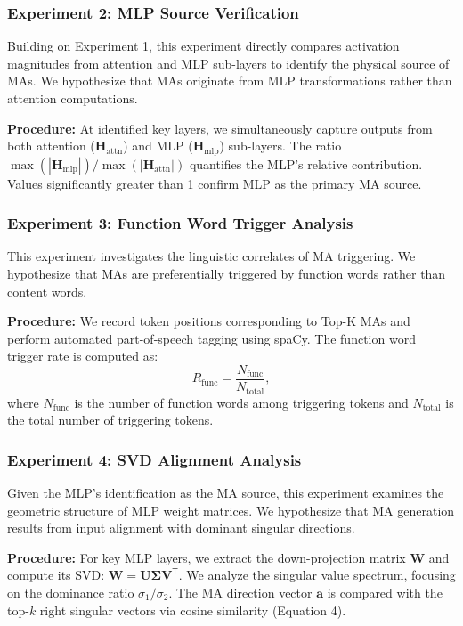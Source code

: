 \documentclass[conference]{IEEEtran}
\begin{document}
\subsubsection{Experiment 2: MLP Source Verification}

Building on Experiment 1, this experiment directly compares activation magnitudes from attention and MLP sub-layers to identify the physical source of MAs. We hypothesize that MAs originate from MLP transformations rather than attention computations.

\textbf{Procedure:} At identified key layers, we simultaneously capture outputs from both attention ($\mathbf{H}_{\text{attn}}$) and MLP ($\mathbf{H}_{\text{mlp}}$) sub-layers. The ratio $\max(|\mathbf{H}_{\text{mlp}}|)/\max(|\mathbf{H}_{\text{attn}}|)$ quantifies the MLP's relative contribution. Values significantly greater than 1 confirm MLP as the primary MA source.

\subsubsection{Experiment 3: Function Word Trigger Analysis}

This experiment investigates the linguistic correlates of MA triggering. We hypothesize that MAs are preferentially triggered by function words rather than content words.

\textbf{Procedure:} We record token positions corresponding to Top-K MAs and perform automated part-of-speech tagging using spaCy. The function word trigger rate is computed as:
\begin{equation}
R_{\text{func}} = \frac{N_{\text{func}}}{N_{\text{total}}},
\end{equation}
where $N_{\text{func}}$ is the number of function words among triggering tokens and $N_{\text{total}}$ is the total number of triggering tokens.

\subsubsection{Experiment 4: SVD Alignment Analysis}

Given the MLP's identification as the MA source, this experiment examines the geometric structure of MLP weight matrices. We hypothesize that MA generation results from input alignment with dominant singular directions.

\textbf{Procedure:} For key MLP layers, we extract the down-projection matrix $\mathbf{W}$ and compute its SVD: $\mathbf{W} = \mathbf{U}\boldsymbol{\Sigma}\mathbf{V}^{\mathsf{T}}$. We analyze the singular value spectrum, focusing on the dominance ratio $\sigma_1/\sigma_2$. The MA direction vector $\mathbf{a}$ is compared with the top-$k$ right singular vectors via cosine similarity (Equation 4).
\end{document}

